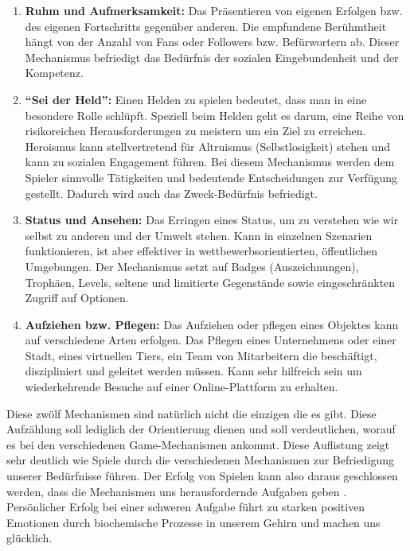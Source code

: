 \documentclass[a4paper,12pt]{scrartcl}
\begin{document}
\begin{description}
\begin{enumerate}
      \item \textbf{Ruhm und Aufmerksamkeit:} Das Präsentieren von eigenen Erfolgen bzw. des eigenen Fortschritts gegenüber anderen. Die empfundene Berühmtheit hängt von der Anzahl von Fans oder Followers bzw. Befürwortern ab. Dieser Mechanismus befriedigt das Bedürfnis der sozialen Eingebundenheit und der Kompetenz.
      \item \textbf{\enquote{Sei der Held}:} Einen Helden zu spielen bedeutet, dass man in eine besondere Rolle schlüpft. Speziell beim Helden geht es darum, eine Reihe von risikoreichen Herausforderungen zu meistern um ein Ziel zu erreichen. Heroismus kann stellvertretend für Altruismus (Selbstlosigkeit) stehen und kann zu sozialen Engagement führen. Bei diesem Mechanismus werden dem Spieler sinnvolle Tätigkeiten und bedeutende Entscheidungen zur Verfügung gestellt. Dadurch wird auch das Zweck-Bedürfnis befriedigt. 
      \item \textbf{Status und Ansehen:} Das Erringen eines Status, um zu verstehen wie wir selbst zu anderen und der Umwelt stehen. Kann in einzelnen Szenarien funktionieren, ist aber effektiver in wettbewerbsorientierten, öffentlichen Umgebungen. Der Mechanismus setzt auf Badges (Auszeichnungen), Trophäen, Levels, seltene und limitierte Gegenstände sowie eingeschränkten Zugriff auf Optionen.
      \item \textbf{Aufziehen bzw. Pflegen:} Das Aufziehen oder pflegen eines Objektes kann auf verschiedene Arten erfolgen. Das Pflegen eines Unternehmens oder einer Stadt, eines virtuellen Tiers, ein Team von Mitarbeitern die beschäftigt, diszipliniert und geleitet werden müssen. Kann sehr hilfreich sein um wiederkehrende Besuche auf einer Online-Plattform zu erhalten.
   \end{enumerate}
\end{description}
Diese zwölf Mechanismen sind natürlich nicht die einzigen die es gibt. Diese Aufzählung soll lediglich der Orientierung dienen und soll verdeutlichen, worauf es bei den verschiedenen Game-Mechanismen ankommt. Diese Auflistung zeigt sehr deutlich wie Spiele durch die verschiedenen Mechanismen zur Befriedigung unserer Bedürfnisse führen. Der Erfolg von Spielen kann also daraus geschlossen werden, dass die Mechanismen uns herausfordernde Aufgaben geben \cite{Mcgonigal2011}. Persönlicher Erfolg bei einer schweren Aufgabe führt zu starken positiven Emotionen durch biochemische Prozesse in unserem Gehirn und machen uns glücklich.
\\\\
\end{document}
